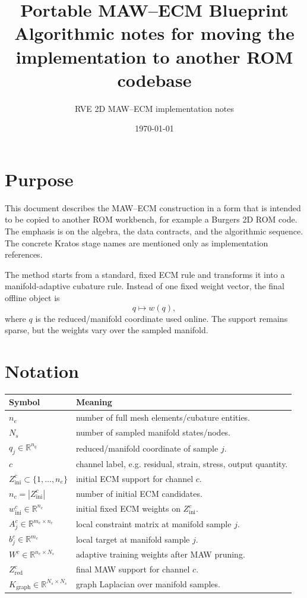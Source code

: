 \documentclass[11pt]{article}
\title{
Portable MAW--ECM Blueprint\\
\large Algorithmic notes for moving the implementation to another ROM codebase
}
\author{RVE 2D MAW--ECM implementation notes}
\date{\today}
\newcommand{\R}{\mathbb{R}}
\newcommand{\Kgraph}{K_{\mathrm{graph}}}
\newcommand{\winit}{w_{\mathrm{ini}}}
\newcommand{\zinit}{Z_{\mathrm{ini}}}
\newcommand{\zred}{Z_{\mathrm{red}}}
\begin{document}
\maketitle

\section{Purpose}

This document describes the MAW--ECM construction in a form that is intended to be
copied to another ROM workbench, for example a Burgers 2D ROM code.  The emphasis
is on the algebra, the data contracts, and the algorithmic sequence.  The concrete
Kratos stage names are mentioned only as implementation references.

The method starts from a standard, fixed ECM rule and transforms it into a
manifold-adaptive cubature rule.  Instead of one fixed weight vector, the final
offline object is
\[
  q \longmapsto w(q),
\]
where \(q\) is the reduced/manifold coordinate used online.  The support remains
sparse, but the weights vary over the sampled manifold.

\section{Notation}

\begin{center}
\begin{tabular}{ll}
\toprule
Symbol & Meaning\\
\midrule
\(n_e\) & number of full mesh elements/cubature entities.\\
\(N_s\) & number of sampled manifold states/nodes.\\
\(q_j\in\R^{n_q}\) & reduced/manifold coordinate of sample \(j\).\\
\(c\) & channel label, e.g. residual, strain, stress, output quantity.\\
\(\zinit^c\subset\{1,\ldots,n_e\}\) & initial ECM support for channel \(c\).\\
\(n_c=|\zinit^c|\) & number of initial ECM candidates.\\
\(\winit^c\in\R^{n_c}\) & initial fixed ECM weights on \(\zinit^c\).\\
\(A_j^c\in\R^{m_c\times n_c}\) & local constraint matrix at manifold sample \(j\).\\
\(b_j^c\in\R^{m_c}\) & local target at manifold sample \(j\).\\
\(W^c\in\R^{n_c\times N_s}\) & adaptive training weights after MAW pruning.\\
\(\zred^c\) & final MAW support for channel \(c\).\\
\(\Kgraph\in\R^{N_s\times N_s}\) & graph Laplacian over manifold samples.\\
\bottomrule
\end{tabular}
\end{center}
\end{document}

